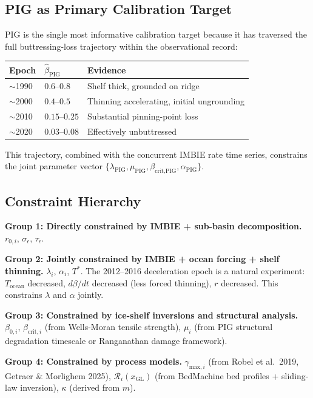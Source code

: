 \documentclass[11pt]{article}
\theoremstyle{definition}
\begin{document}
\subsection{PIG as Primary Calibration Target}

PIG is the single most informative calibration target because it has traversed the full buttressing-loss trajectory within the observational record:
\begin{center}
\begin{tabular}{lll}
  \toprule
  \textbf{Epoch} & $\hat{\beta}_\text{PIG}$ & \textbf{Evidence} \\
  \midrule
  $\sim$1990 & $0.6$--$0.8$ & Shelf thick, grounded on ridge \\
  $\sim$2000 & $0.4$--$0.5$ & Thinning accelerating, initial ungrounding \\
  $\sim$2010 & $0.15$--$0.25$ & Substantial pinning-point loss \\
  $\sim$2020 & $0.03$--$0.08$ & Effectively unbuttressed \\
  \bottomrule
\end{tabular}
\end{center}

This trajectory, combined with the concurrent IMBIE rate time series, constrains the joint parameter vector $\{\lambda_\text{PIG}, \mu_\text{PIG}, \beta_{\text{crit},\text{PIG}}, \alpha_\text{PIG}\}$.

\subsection{Constraint Hierarchy}

\textbf{Group 1: Directly constrained by IMBIE + sub-basin decomposition.}
$r_{0,i}$, $\sigma_\epsilon$, $\tau_\epsilon$.

\textbf{Group 2: Jointly constrained by IMBIE + ocean forcing + shelf thinning.}
$\lambda_i$, $\alpha_i$, $T^{*}$.  The 2012--2016 deceleration epoch is a natural experiment: $T_{\text{ocean}}$ decreased, $d\beta/dt$ decreased (less forced thinning), $r$ decreased.  This constrains $\lambda$ and $\alpha$ jointly.

\textbf{Group 3: Constrained by ice-shelf inversions and structural analysis.}
$\beta_{0,i}$, $\beta_{\text{crit},i}$ (from Wells-Moran tensile strength), $\mu_i$ (from PIG structural degradation timescale or Ranganathan damage framework).

\textbf{Group 4: Constrained by process models.}
$\gamma_{\text{max},i}$ (from Robel et al.\ 2019, Getraer \& Morlighem 2025), $\mathcal{R}_i(x_\text{GL})$ (from BedMachine bed profiles + sliding-law inversion), $\kappa$ (derived from $m$).
\end{document}
